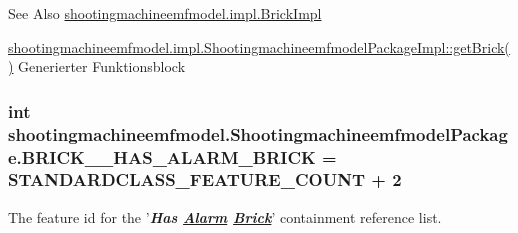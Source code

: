 \begin{DoxySeeAlso}{See Also}
\hyperlink{classshootingmachineemfmodel_1_1impl_1_1_brick_impl}{shootingmachineemfmodel.\-impl.\-Brick\-Impl} 

\hyperlink{classshootingmachineemfmodel_1_1impl_1_1_shootingmachineemfmodel_package_impl_aaef94e2843dca6a355980df230d01339}{shootingmachineemfmodel.\-impl.\-Shootingmachineemfmodel\-Package\-Impl\-::get\-Brick()} Generierter Funktionsblock 
\end{DoxySeeAlso}
\hypertarget{interfaceshootingmachineemfmodel_1_1_shootingmachineemfmodel_package_a13634cc753a61b2654bba945425c6a2a}{
\subsubsection[{B\-R\-I\-C\-K\-\_\-\-\_\-\-H\-A\-S\-\_\-\-A\-L\-A\-R\-M\-\_\-\-B\-R\-I\-C\-K}]{\setlength{\rightskip}{0pt plus 5cm}int shootingmachineemfmodel.\-Shootingmachineemfmodel\-Package.\-B\-R\-I\-C\-K\-\_\-\-\_\-\-H\-A\-S\-\_\-\-A\-L\-A\-R\-M\-\_\-\-B\-R\-I\-C\-K = {\bf S\-T\-A\-N\-D\-A\-R\-D\-C\-L\-A\-S\-S\-\_\-\-F\-E\-A\-T\-U\-R\-E\-\_\-\-C\-O\-U\-N\-T} + 2}}\label{interfaceshootingmachineemfmodel_1_1_shootingmachineemfmodel_package_a13634cc753a61b2654bba945425c6a2a}
The feature id for the '{\itshape {\bfseries Has \hyperlink{interfaceshootingmachineemfmodel_1_1_alarm}{Alarm} \hyperlink{interfaceshootingmachineemfmodel_1_1_brick}{Brick}}}' containment reference list.

